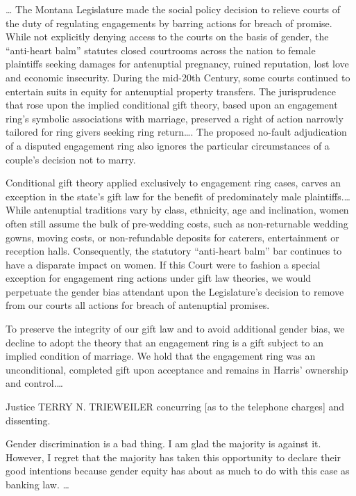 
\dots{} The Montana Legislature made the social policy decision to relieve
courts of the duty of regulating engagements by barring actions for breach of
promise. While not explicitly denying access to the courts on the basis of
gender, the ``anti-heart balm'' statutes closed courtrooms across the nation to
female plaintiffs seeking damages for antenuptial pregnancy, ruined reputation,
lost love and economic insecurity. During the mid-20th Century, some courts
continued to entertain suits in equity for antenuptial property transfers. The
jurisprudence that rose upon the implied conditional gift theory, based upon an
engagement ring's symbolic associations with marriage, preserved a right of
action narrowly tailored for ring givers seeking ring return\dots{}. The
proposed no-fault adjudication of a disputed engagement ring also ignores the
particular circumstances of a couple's decision not to marry.

Conditional gift theory applied exclusively to engagement ring cases, carves an
exception in the state's gift law for the benefit of predominately male
plaintiffs.\dots{}While antenuptial traditions vary by class, ethnicity, age
and inclination, women often still assume the bulk of pre-wedding costs, such
as non-returnable wedding gowns, moving costs, or non-refundable deposits for
caterers, entertainment or reception halls. Consequently, the statutory
``anti-heart balm'' bar continues to have a disparate impact on women. If this
Court were to fashion a special exception for engagement ring actions under
gift law theories, we would perpetuate the gender bias attendant upon the
Legislature's decision to remove from our courts all actions for breach of
antenuptial promises. 


To preserve the integrity of our gift law and to avoid additional gender bias,
we decline to adopt the theory that an engagement ring is a gift subject to an
implied condition of marriage. We hold that the engagement ring was an
unconditional, completed gift upon acceptance and remains in Harris' ownership
and control.\dots{}

Justice TERRY N. TRIEWEILER concurring [as to the telephone charges] and
dissenting.

Gender discrimination is a bad thing. I am glad the majority is against it.
However, I regret that the majority has taken this opportunity to declare their
good intentions because gender equity has about as much to do with this case as
banking law. \dots{} 

